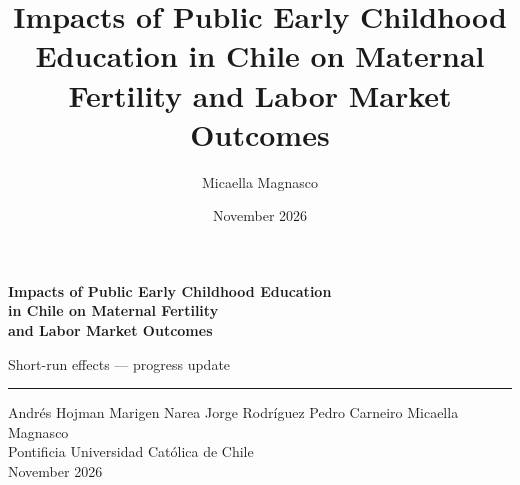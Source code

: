 \documentclass[aspectratio=169,10pt]{beamer}
\title{Impacts of Public Early Childhood Education in Chile on Maternal Fertility and Labor Market Outcomes}
\author{Micaella Magnasco}
\date{November 2026}
\begin{document}
\begin{frame}[plain]
\vspace{40pt}
\begin{center}
{\LARGE\bfseries\color{navy} Impacts of Public Early Childhood Education\\[3pt] in Chile on Maternal Fertility\\[3pt] and Labor Market Outcomes}

\vspace{8pt}
{\large\color{graytext} Short-run effects --- progress update}

\vspace{10pt}
\textcolor{steel}{\rule{0.5\paperwidth}{0.6pt}}

\vspace{18pt}
{\normalsize
Andr\'es Hojman \quad Marigen Narea \quad Jorge Rodr\'iguez \quad Pedro Carneiro \quad Micaella Magnasco\\[8pt]
\small Pontificia Universidad Cat\'olica de Chile \\[2pt]
\small November 2026
}
\end{center}
\end{frame}
\end{document}
